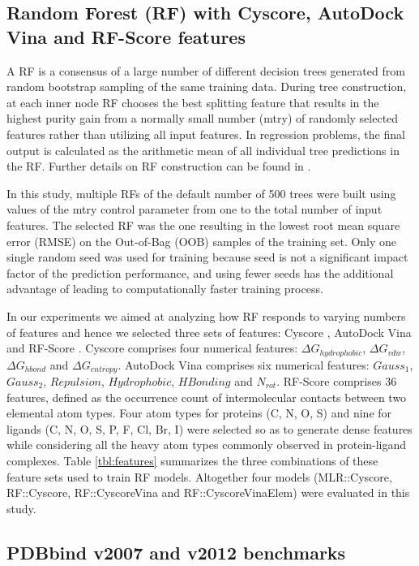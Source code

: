 \documentclass[twocolumn]{bmcart}
\begin{document}
\subsection*{Random Forest (RF) with Cyscore, AutoDock Vina and RF-Score features}

A RF \cite{1309} is a consensus of a large number of different decision trees generated from random bootstrap sampling of the same training data. During tree construction, at each inner node RF chooses the best splitting feature that results in the highest purity gain from a normally small number (mtry) of randomly selected features rather than utilizing all input features. In regression problems, the final output is calculated as the arithmetic mean of all individual tree predictions in the RF. Further details on RF construction can be found in \cite{564,1362}.

In this study, multiple RFs of the default number of 500 trees were built using values of the mtry control parameter from one to the total number of input features. The selected RF was the one resulting in the lowest root mean square error (RMSE) on the Out-of-Bag (OOB) samples of the training set. Only one single random seed was used for training because seed is not a significant impact factor of the prediction performance, and using fewer seeds has the additional advantage of leading to computationally faster training process.

In our experiments we aimed at analyzing how RF responds to varying numbers of features and hence we selected three sets of features: Cyscore \cite{1372}, AutoDock Vina \cite{595} and RF-Score \cite{564}. Cyscore comprises four numerical features: $\Delta G_{hydrophobic}$, $\Delta G_{vdw}$, $\Delta G_{hbond}$ and $\Delta G_{entropy}$. AutoDock Vina comprises six numerical features: $Gauss_1$, $Gauss_2$, $Repulsion$, $Hydrophobic$, $HBonding$ and $N_{rot}$. RF-Score comprises 36 features, defined as the occurrence count of intermolecular contacts between two elemental atom types. Four atom types for proteins (C, N, O, S) and nine for ligands (C, N, O, S, P, F, Cl, Br, I) were selected so as to generate dense features while considering all the heavy atom types commonly observed in protein-ligand complexes. Table \ref{tbl:features} summarizes the three combinations of these feature sets used to train RF models. Altogether four models (MLR::Cyscore, RF::Cyscore, RF::CyscoreVina and RF::CyscoreVinaElem) were evaluated in this study.

\subsection*{PDBbind v2007 and v2012 benchmarks}
\end{document}
